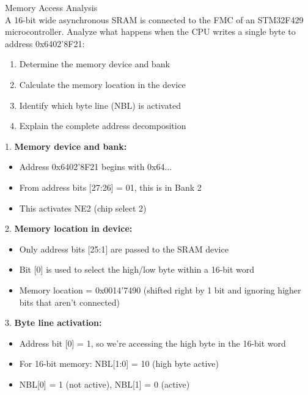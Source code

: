 \begin{example2}{Memory Access Analysis}\\
A 16-bit wide asynchronous SRAM is connected to the FMC of an STM32F429 microcontroller. Analyze what happens when the CPU writes a single byte to address 0x6402'8F21:

\begin{enumerate}
    \item Determine the memory device and bank
    \item Calculate the memory location in the device
    \item Identify which byte line (NBL) is activated
    \item Explain the complete address decomposition
\end{enumerate}

\tcblower

1. \textbf{Memory device and bank:}
   \begin{itemize}
     \item Address 0x6402'8F21 begins with 0x64...
     \item From address bits [27:26] = 01, this is in Bank 2
     \item This activates NE2 (chip select 2)
   \end{itemize}

2. \textbf{Memory location in device:}
   \begin{itemize}
     \item Only address bits [25:1] are passed to the SRAM device
     \item Bit [0] is used to select the high/low byte within a 16-bit word
     \item Memory location = 0x0014'7490 (shifted right by 1 bit and ignoring higher bits that aren't connected)
   \end{itemize}

3. \textbf{Byte line activation:}
   \begin{itemize}
     \item Address bit [0] = 1, so we're accessing the high byte in the 16-bit word
     \item For 16-bit memory: NBL[1:0] = 10 (high byte active)
     \item NBL[0] = 1 (not active), NBL[1] = 0 (active)
   \end{itemize}


\end{example2}
